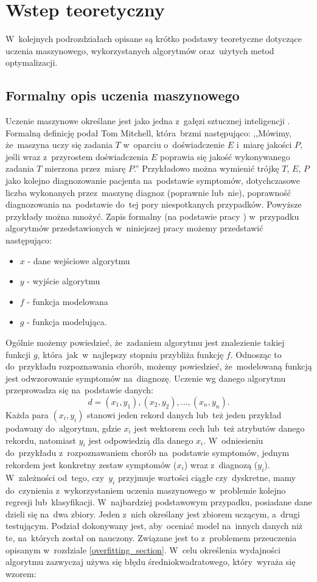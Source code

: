 \section{Wstep teoretyczny} \label{theory}
W~kolejnych podrozdziałach opisane są krótko podstawy teoretyczne dotyczące uczenia maszynowego, wykorzystanych algorytmów oraz~użytych metod optymalizacji.
\subsection{Formalny opis uczenia maszynowego}
Uczenie maszynowe określane jest jako jedna z~gałęzi sztucznej inteligencji \cite{dnn1}. Formalną definicję podał Tom Mitchell, która~brzmi następująco: ,,Mówimy, że~maszyna uczy się zadania $T$ w~oparciu o~doświadczenie $E$ i~miarę jakości $P$, jeśli wraz z~przyrostem doświadczenia $E$ poprawia się jakość wykonywanego zadania $T$ mierzona przez~miarę $P$.''\cite{mitchel} Przykładowo można wymienić trójkę $T$, $E$, $P$ jako kolejno diagnozowanie pacjenta na~podstawie symptomów, dotychczasowe  liczba wykonanych przez~maszynę diagnoz (poprawnie lub~nie),  poprawność diagnozowania na~podstawie do~tej pory niespotkanych przypadków. Powyższe przykłady można mnożyć. Zapis formalny (na podstawie pracy \cite{formal2}) w~przypadku algorytmów przedstawionych w~niniejszej pracy możemy przedstawić następująco:
\begin{itemize}
\item $x$ - dane wejściowe algorytmu
\item $y$ - wyjście algorytmu
\item $f$ - funkcja modelowana
\item $g$ - funkcja modelująca.
\end{itemize}
Ogólnie możemy powiedzieć, że~zadaniem algorytmu jest znalezienie takiej funkcji $g$, która~jak~w~najlepszy stopniu przybliża funkcję $f$. Odnosząc to do~przykładu rozpoznawania chorób, możemy powiedzieć, że~modelowaną funkcją jest odwzorowanie symptomów na~diagnozę. Uczenie wg danego algorytmu przeprowadza się na~podstawie danych:
\begin{equation}
d = (x_1,y_1), (x_2, y_2), ..., (x_n, y_n).
\end{equation}
Każda para $(x_i, y_i)$ stanowi jeden rekord danych lub~też jeden przykład podawany do~algorytmu, gdzie $x_i$ jest wektorem cech lub~też atrybutów danego rekordu, natomiast $y_i$ jest odpowiedzią dla danego $x_i$. W~odniesieniu do~przykładu z~rozpoznawaniem chorób na~podstawie symptomów, jednym rekordem jest konkretny zestaw symptomów ($x_i$) wraz z~diagnozą ($y_i$). W~zależności od~tego, czy~$y_i$ przyjmuje wartości ciągłe czy~dyskretne, mamy do~czynienia z~wykorzystaniem uczenia maszynowego w~problemie kolejno regresji lub~klasyfikacji. W~najbardziej podstawowym przypadku, posiadane dane dzieli się na~dwa zbiory. Jeden z~nich określany jest zbiorem uczącym, a~drugi testującym. Podział dokonywany jest, aby~oceniać model na~innych danych niż te, na~których został on nauczony. Związane jest to z~problemem przeuczenia opisanym w~rozdziale \ref{overfitting_section}. W~celu określenia wydajności algorytmu zazwyczaj używa się błędu średniokwadratowego, który~wyraża się wzorem:
